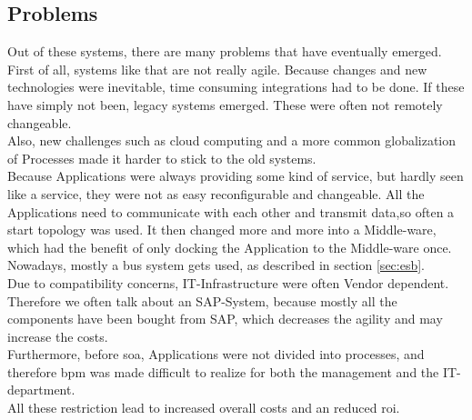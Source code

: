 \documentclass[12pt]{article}
\begin{document}
\subsection{Problems}
Out of these systems, there are many problems that have eventually emerged. \\
First of all, systems like that are not really agile. Because changes and new technologies were inevitable, time consuming integrations had to be done. If these have simply not been, legacy systems emerged. These were often not remotely changeable. \\
Also, new challenges such as cloud computing and a more common globalization of Processes made it harder to stick to the old systems. \\
Because Applications were always providing some kind of service, but hardly seen like a service, they were not as easy reconfigurable and changeable. All the Applications need to communicate with each other and transmit data,so often a start topology was used. It then changed more and more into a Middle-ware, which had the benefit of only docking the Application to the Middle-ware once. Nowadays, mostly a bus system gets used, as described in section \ref{sec:esb}. \\
Due to compatibility concerns, IT-Infrastructure were often Vendor dependent. Therefore we often talk about an SAP-System, because mostly all the components have been bought from SAP, which decreases the agility and may increase the costs.\\
Furthermore, before \gls{soa}, Applications were not divided into processes, and therefore \gls{bpm} was made difficult to realize for both the management and the IT-department. \\
All these restriction lead to increased overall costs and an reduced \gls{roi}.
\end{document}

